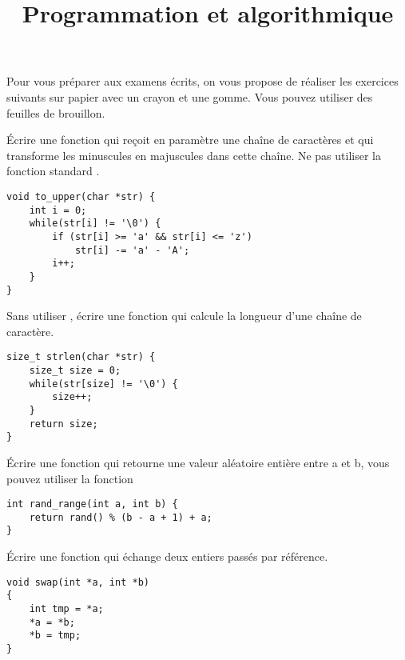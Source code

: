 \documentclass[french,a4paper,addpoints,11pt]{exam}
\title{Programmation et algorithmique}
\begin{document}
\maketitle

Pour vous préparer aux examens écrits, on vous propose de réaliser les exercices suivants sur papier avec un crayon et une gomme. Vous pouvez utiliser des feuilles de brouillon.

\begin{questions}

\question Écrire une fonction qui reçoit en paramètre une chaîne de caractères et qui transforme les minuscules en majuscules dans cette chaîne. Ne pas utiliser la fonction standard .

\begin{solutionordottedlines}[6cm]
\begin{lstlisting}
void to_upper(char *str) {
    int i = 0;
    while(str[i] != '\0') {
        if (str[i] >= 'a' && str[i] <= 'z')
            str[i] -= 'a' - 'A';
        i++;
    }
}
\end{lstlisting}
\end{solutionordottedlines}

\question Sans utiliser , écrire une fonction qui calcule la longueur d'une chaîne de caractère.

\begin{solutionordottedlines}[5cm]
\begin{lstlisting}
size_t strlen(char *str) {
    size_t size = 0;
    while(str[size] != '\0') {
        size++;
    }
    return size;
}
\end{lstlisting}
\end{solutionordottedlines}

\question Écrire une fonction qui retourne une valeur aléatoire entière entre a et b, vous pouvez utiliser la fonction 

\begin{solutionordottedlines}[3cm]
\begin{lstlisting}
int rand_range(int a, int b) {
    return rand() % (b - a + 1) + a;
}
\end{lstlisting}
\end{solutionordottedlines}

\question Écrire une fonction qui échange deux entiers passés par référence.

\begin{solutionordottedlines}[7cm]
\begin{lstlisting}
void swap(int *a, int *b)
{
    int tmp = *a;
    *a = *b;
    *b = tmp;
}
\end{lstlisting}
\end{solutionordottedlines}


\end{questions}
\end{document}
